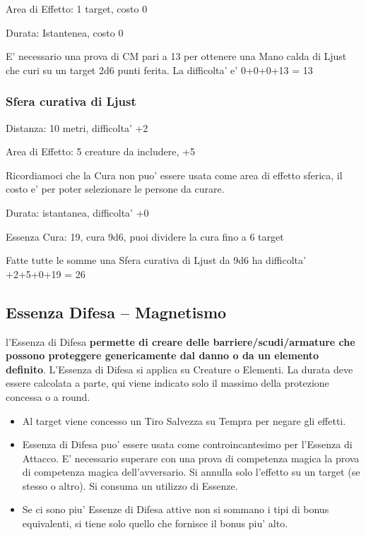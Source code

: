 \documentclass[a4paper,11pt,twoside,openany]{book}
\begin{document}
	Area di Effetto: 1 target, costo 0
	
	Durata: Istantenea, costo 0
	
	E’ necessario una prova di CM pari a 13 per ottenere una Mano calda di Ljust che curi su un target
	2d6 punti ferita. La difficolta’ e’ 0+0+0+13 = 13
	
	\subsubsection{Sfera curativa di Ljust}
	
	Distanza: 10 metri, difficolta' +2
	
	Area di Effetto: 5 creature da includere, +5
	
	Ricordiamoci che la Cura non puo' essere usata come area di effetto sferica, il costo e' per poter selezionare le persone da curare.
	
	Durata: istantanea, difficolta' +0
	
	Essenza Cura: 19, cura 9d6, puoi dividere la cura fino a 6 target
	
	Fatte tutte le somme una Sfera curativa di Ljust da 9d6 ha difficolta' +2+5+0+19 = 26
	
	\pagebreak
	
	\subsection{Essenza Difesa -- Magnetismo}
	
	\label{essenza-difesa---magnetismo}
	
	l'Essenza di Difesa \textbf{permette di creare delle barriere/scudi/armature che possono proteggere genericamente dal danno o da un elemento definito}. L'Essenza di Difesa si applica su Creature o Elementi. La durata deve essere calcolata a parte, qui viene indicato solo il massimo della protezione concessa o a round.
	\begin{itemize}
		\item 
		Al target viene concesso un Tiro Salvezza su Tempra per negare gli effetti. 
		\item 
		Essenza di Difesa puo' essere usata come controincantesimo per l'Essenza di Attacco. E' necessario superare con una prova di competenza magica la prova di competenza magica dell'avversario. Si annulla solo l'effetto su un target (se stesso o altro). Si consuma un utilizzo di Essenze. 
		\item 
		Se ci sono piu' Essenze di Difesa attive non si sommano i tipi di bonus equivalenti, si tiene solo quello che fornisce il bonus piu' alto. 
	\end{itemize}
	
\end{document}
